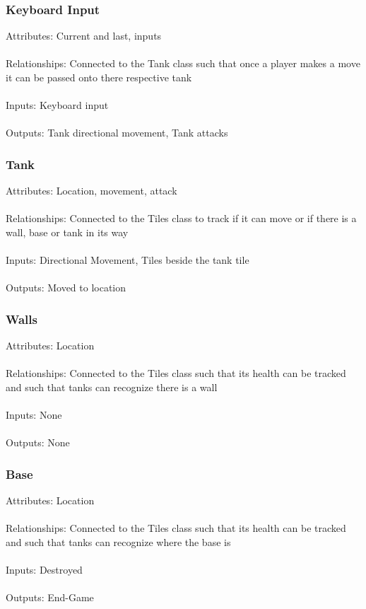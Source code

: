 \documentclass{article}
\begin{document}
\subsubsection{Keyboard Input}
Attributes: Current and last, inputs
\\\\Relationships: Connected to the Tank class such that once a player makes a 
move it can be passed onto there respective tank
\\\\Inputs: Keyboard input
\\\\Outputs: Tank directional movement, Tank attacks

\subsubsection{Tank}
Attributes: Location, movement, attack
\\\\Relationships: Connected to the Tiles class to track if it can move or if 
there is a wall, base or tank in its way
\\\\Inputs: Directional Movement, Tiles beside the tank tile
\\\\Outputs: Moved to location

\subsubsection{Walls}
Attributes: Location
\\\\Relationships: Connected to the Tiles class such that its health can be 
tracked and such that tanks can recognize there is a wall
\\\\Inputs: None
\\\\Outputs: None

\subsubsection{Base}
Attributes: Location
\\\\Relationships: Connected to the Tiles class such that its health can be 
tracked and such that tanks can recognize where the base is
\\\\Inputs: Destroyed
\\\\Outputs: End-Game
\end{document}
